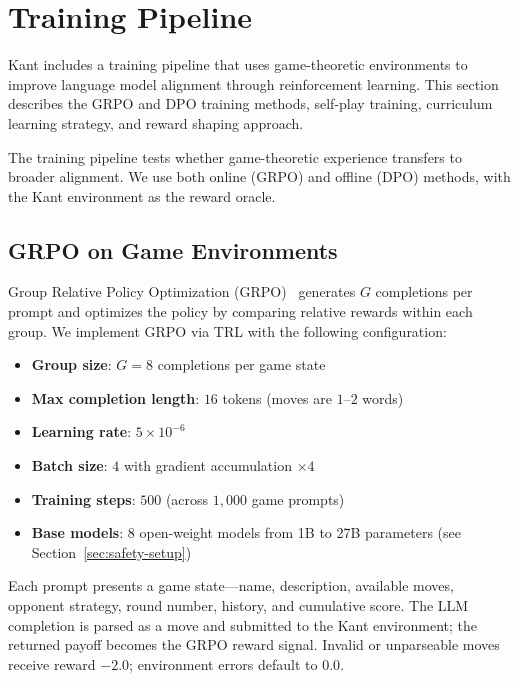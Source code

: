 
\section{Training Pipeline}
\label{sec:training}

Kant includes a training pipeline that uses game-theoretic environments to
improve language model alignment through reinforcement learning. This section
describes the GRPO and DPO training methods, self-play training, curriculum
learning strategy, and reward shaping approach.

The training pipeline tests whether game-theoretic experience transfers to
broader alignment. We use both online (GRPO) and offline (DPO) methods,
with the Kant environment as the reward oracle.

\subsection{GRPO on Game Environments}
\label{sec:grpo}

Group Relative Policy Optimization (GRPO)~\citep{shao2024deepseekmath}
generates $G$ completions per prompt and optimizes the policy by comparing
relative rewards within each group. We implement GRPO via TRL with the
following configuration:

\begin{itemize}[nosep]
    \item \textbf{Group size}: $G = 8$ completions per game state
    \item \textbf{Max completion length}: $16$ tokens (moves are $1$--$2$ words)
    \item \textbf{Learning rate}: $5 \times 10^{-6}$
    \item \textbf{Batch size}: $4$ with gradient accumulation $\times 4$
    \item \textbf{Training steps}: $500$ (across $1{,}000$ game prompts)
    \item \textbf{Base models}: 8 open-weight models from 1B to 27B parameters
          (see Section~\ref{sec:safety-setup})
\end{itemize}

\noindent Each prompt presents a game state---name, description, available
moves, opponent strategy, round number, history, and cumulative score.
The LLM completion is parsed as a move and submitted to the Kant environment;
the returned payoff becomes the GRPO reward signal. Invalid or unparseable
moves receive reward $-2.0$; environment errors default to $0.0$.

